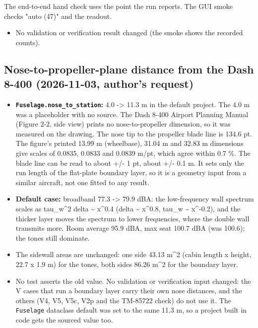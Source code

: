 \documentclass[10pt,a4paper]{article}
\begin{document}
The end-to-end hand check uses the point the run reports. The GUI smoke checks "auto (47)" and the readout.

\begin{itemize}
\item No validation or verification result changed (the smoke shows the recorded counts).
\end{itemize}

\subsection*{Nose-to-propeller-plane distance from the Dash 8-400 (2026-11-03, author's request)}

\begin{itemize}
\item \textbf{\texttt{Fuselage.\allowbreak{}nose\_\allowbreak{}to\_\allowbreak{}station}:} 4.0 -> 11.3 m in the default project. The 4.0 m was a placeholder with no source. The Dash 8-400 Airport Planning Manual (Figure 2-2, side view) prints no nose-to-propeller dimension, so it was measured on the drawing. The nose tip to the propeller blade line is 134.6 pt. The figure's printed 13.99 m (wheelbase), 31.04 m and 32.83 m dimensions give scales of 0.0835, 0.0833 and 0.0839 m/pt, which agree within 0.7 \%. The blade line can be read to about +/- 1 pt, about +/- 0.1 m. It sets only the run length of the flat-plate boundary layer, so it is a geometry input from a similar aircraft, not one fitted to any result.
\item \textbf{Default case:} broadband 77.3 -> 79.9 dBA: the low-frequency wall spectrum scales as tau\_w\textasciicircum{}2 delta \textasciitilde{} x\textasciicircum{}0.4 (delta \textasciitilde{} x\textasciicircum{}0.8, tau\_w \textasciitilde{} x\textasciicircum{}-0.2), and the thicker layer moves the spectrum to lower frequencies, where the double wall transmits more. Room average 95.9 dBA, max seat 100.7 dBA (was 100.6); the tones still dominate.
\item The sidewall areas are unchanged: one side 43.13 m\textasciicircum{}2 (cabin length x height, 22.7 x 1.9 m) for the tones, both sides 86.26 m\textasciicircum{}2 for the boundary layer.
\item No test asserts the old value. No validation or verification input changed: the V cases that run a boundary layer carry their own nose distances, and the others (V4, V5, V5c, V2p and the TM-85722 check) do not use it. The \texttt{Fuselage} dataclass default was set to the same 11.3 m, so a project built in code gets the sourced value too.
\end{itemize}
\end{document}
